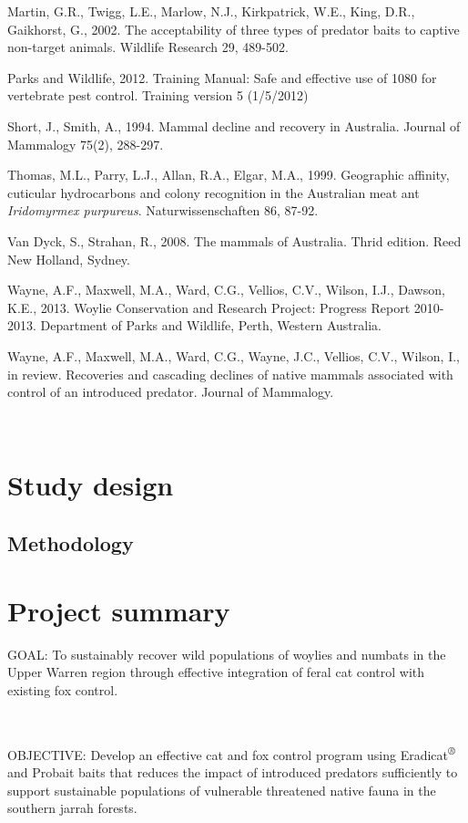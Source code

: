 \documentclass[version=last,
    paper=a4,                               %
    10pt,                                   %
    dvipsnames,
    oneside,                              %
    headings=openany,                       %
    open=any,
    BCOR=7mm,                               %
    DIV=15,     %
]{scrbook}
\begin{document}
Martin, G.R., Twigg, L.E., Marlow, N.J., Kirkpatrick, W.E., King, D.R.,
Gaikhorst, G., 2002. The acceptability of three types of predator baits
to captive non-target animals. Wildlife Research 29, 489-502.

Parks and Wildlife, 2012. Training Manual: Safe and effective use of
1080 for vertebrate pest control. Training version 5 (1/5/2012)

Short, J., Smith, A., 1994. Mammal decline and recovery in Australia.
Journal of Mammalogy 75(2), 288-297.

Thomas, M.L., Parry, L.J., Allan, R.A., Elgar, M.A., 1999. Geographic
affinity, cuticular hydrocarbons and colony recognition in the
Australian meat ant \emph{Iridomyrmex purpureus}. Naturwissenschaften
86, 87-92.

Van Dyck, S., Strahan, R., 2008. The mammals of Australia. Thrid
edition. Reed New Holland, Sydney.

Wayne, A.F., Maxwell, M.A., Ward, C.G., Vellios, C.V., Wilson, I.J.,
Dawson, K.E., 2013. Woylie Conservation and Research Project: Progress
Report 2010-2013. Department of Parks and Wildlife, Perth, Western
Australia.

Wayne, A.F., Maxwell, M.A., Ward, C.G., Wayne, J.C., Vellios, C.V.,
Wilson, I., in review. Recoveries and cascading declines of native
mammals associated with control of an introduced predator. Journal of
Mammalogy.

~



\section*{Study design}


\subsection*{Methodology}

\section{Project summary}

GOAL: To sustainably recover wild populations of woylies and numbats in
the Upper Warren region through effective integration of feral cat
control with existing fox control.

\textbf{~}

OBJECTIVE: Develop an effective cat and fox control program using
Eradicat\emph{\textsuperscript{®}} and Probait baits that reduces the
impact of introduced predators sufficiently to support sustainable
populations of vulnerable threatened native fauna in the southern jarrah
forests.
\end{document}
